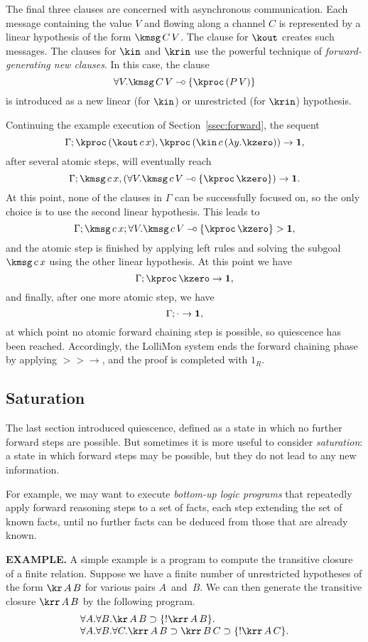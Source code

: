 \documentclass{sig-alt}
\begin{document}
The final three clauses are concerned with asynchronous communication.
Each message containing the value $V$ and flowing along a channel $C$
is represented by a linear hypothesis of the form $\kmsg\,C\,V$. The
clause for $\kout$ creates such messages.  The clauses for $\kin$ and
$\krin$ use the powerful technique of \emph{forward-generating new
clauses}. In this case, the clause
$$
  \forall V.\kmsg\,C\,V \limp \{\kproc\,(P\,V)\}
$$
is introduced as a new linear (for $\kin$) or unrestricted (for $\krin$)
hypothesis.

Continuing the example execution of Section~\ref{ssec:forward}, the
sequent
$$
  \CLFLseq{\Gamma}{\kproc\,(\kout\,c\,x), \kproc\,(\kin\,c\,(\lambda y.\kzero))}{\one},
$$
after several atomic steps, will eventually reach
$$
  \CLFLseq{\Gamma}{\kmsg\,c\,x, (\forall V.\kmsg\,c\,V \limp \{\kproc\,\kzero\})}{\one}.
$$
%
At this point, none of the clauses in $\Gamma$ can be successfully
focused on, so the only choice is to use the second linear hypothesis.
This leads to
$$
  \CLFLLFseq{\Gamma}{\kmsg\,c\,x}{\forall V.\kmsg\,c\,V \limp \{\kproc\,\kzero\}}{\one},
$$
%
and the atomic step is finished by applying left rules and solving
the subgoal $\kmsg\,c\,x$ using the other linear hypothesis.
At this point we have
$$
  \CLFLseq{\Gamma}{\kproc\,\kzero}{\one},
$$
and finally, after one more atomic step, we have
$$
  \Gamma;\cdot\rightarrow\textbf{1},
$$
at which point no atomic forward chaining step is possible, so quiescence
has been reached. Accordingly, the LolliMon system ends the forward chaining
phase by applying $>\!\! >\rightarrow$, and the proof is completed with $1_R$.

\subsection{Saturation}
\label{ssec:saturation}
The last section introduced quiescence, defined as a state in which
no further forward steps are possible.  But sometimes it is more useful
to consider \emph{saturation}: a state in which forward steps may be
possible, but they do not lead to any new information.

%
For example, we may want to execute \emph{bottom-up logic programs}
that repeatedly apply forward reasoning steps to a set of facts,
each step extending the set of known facts, until no further facts
can be deduced from those that are already known.

{\bf EXAMPLE.}\enspace
A simple example is a program to compute the
transitive closure of a finite relation. Suppose we have a finite
number of unrestricted hypotheses of the form $\kr\,A\,B$ for various
pairs $A$~and~$B$.  We can then generate the transitive closure
$\krr\,A\,B$ by the following program.
$$
\begin{array}{l}
  \forall A.\forall B.\kr\,A\,B \iimp \{!\krr\,A\,B\}. \\
  \forall A.\forall B.\forall C.
    \krr\,A\,B \iimp \krr\,B\,C \iimp \{!\krr\,A\,C\}. \\
\end{array}
$$
\end{document}
